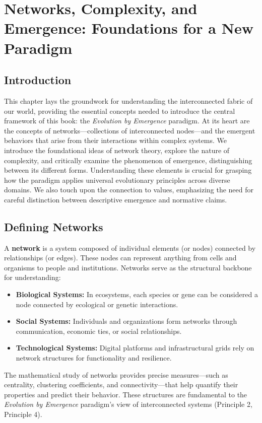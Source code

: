 \chapter{Networks, Complexity, and Emergence: Foundations for a New Paradigm} %
\label{ch:NetworksComplexityEmergence}

\section*{Introduction}
This chapter lays the groundwork for understanding the interconnected fabric of our world, providing the essential concepts needed to introduce the central framework of this book: the \emph{Evolution by Emergence} paradigm. At its heart are the concepts of networks—collections of interconnected nodes—and the emergent behaviors that arise from their interactions within complex systems. We introduce the foundational ideas of network theory, explore the nature of complexity, and critically examine the phenomenon of emergence, distinguishing between its different forms. Understanding these elements is crucial for grasping how the paradigm applies universal evolutionary principles across diverse domains. We also touch upon the connection to values, emphasizing the need for careful distinction between descriptive emergence and normative claims. %

\section*{Defining Networks}
A \textbf{network} is a system composed of individual elements (or nodes) connected by relationships (or edges). These nodes can represent anything from cells and organisms to people and institutions. Networks serve as the structural backbone for understanding:
\begin{itemize}
    \item \textbf{Biological Systems:} In ecosystems, each species or gene can be considered a node connected by ecological or genetic interactions.
    \item \textbf{Social Systems:} Individuals and organizations form networks through communication, economic ties, or social relationships.
    \item \textbf{Technological Systems:} Digital platforms and infrastructural grids rely on network structures for functionality and resilience.
\end{itemize}
The mathematical study of networks provides precise measures---such as centrality, clustering coefficients, and connectivity---that help quantify their properties and predict their behavior. These structures are fundamental to the \emph{Evolution by Emergence} paradigm's view of interconnected systems (Principle 2, Principle 4). %

